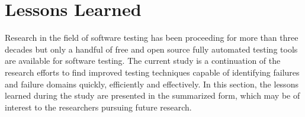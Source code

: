 


\section{Lessons Learned}
Research in the field of software testing has been proceeding for more than three decades but only a handful of free and open source fully automated testing tools are available for software testing. The current study is a continuation of the research efforts to find improved testing techniques capable of identifying failures and failure domains quickly, efficiently and effectively. In this section, the lessons learned during the study are presented in the summarized form, which may be of interest to the researchers pursuing future research.

  
